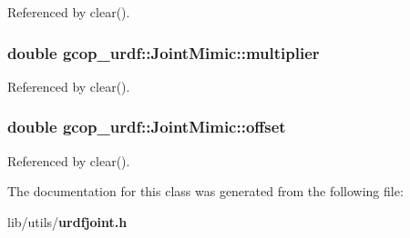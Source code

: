 \-Referenced by clear().

\subsubsection[{multiplier}]{\setlength{\rightskip}{0pt plus 5cm}double {\bf gcop\-\_\-urdf\-::\-Joint\-Mimic\-::multiplier}}\label{classgcop__urdf_1_1JointMimic_aa7294b9983803b0d85a57e8115431a3a}


\-Referenced by clear().

\subsubsection[{offset}]{\setlength{\rightskip}{0pt plus 5cm}double {\bf gcop\-\_\-urdf\-::\-Joint\-Mimic\-::offset}}\label{classgcop__urdf_1_1JointMimic_a20689d9f504b5bc79def2222b9d73d13}


\-Referenced by clear().



\-The documentation for this class was generated from the following file\-:\begin{DoxyCompactItemize}
\item 
lib/utils/{\bf urdfjoint.\-h}\end{DoxyCompactItemize}
